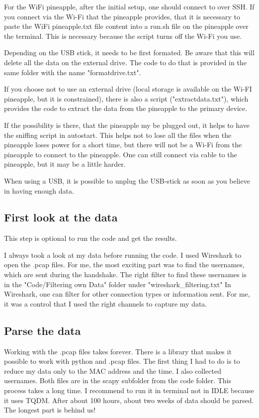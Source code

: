 \documentclass[11pt]{article}
\begin{document}
For the WiFi pineapple, after the initial setup, one should connect to over SSH. 
If you connect via the Wi-Fi that the pineapple provides, that it is necessary to paste the WiFi pineapple.txt file content into a run.sh file on the pineapple over the terminal. 
This is necessary because the script turns off the Wi-Fi you use.

Depending on the USB stick, it needs to be first formated. Be aware that this will delete all the data on the external drive.
The code to do that is provided in the same folder with the name "formatdrive.txt".

If you choose not to use an external drive (local storage is available on the Wi-FI pineapple, but it is constrained), there is also a script ("extractdata.txt"), which provides the code to extract the data from the pineapple to the primary device.

If the possibility is there, that the pineapple my be plugged out, it helps to have the sniffing script in autostart. This helps not to lose all the files when the pineapple loses power for a short time, but there will not be a Wi-Fi from the pineapple to connect to the pineapple. One can still connect via cable to the pineapple, but it may be a little harder.

When using a USB, it is possible to unplug the USB-stick as soon as you believe in having enough data.

\subsection{First look at the data}
This step is optional to run the code and get the results.

I always took a look at my data before running the code. I used Wireshark to open the .pcap files. 
For me, the most exciting part was to find the usernames, which are sent during the handshake.
The right filter to find these usernames is in the "Code/Filtering own Data" folder under "wireshark\_filtering.txt"
In Wireshark, one can filter for other connection types or information sent. For me, it was a control that I used the right channels to capture my data.

\subsection{Parse the data}
Working with the .pcap files takes forever. There is a library that makes it possible to work with python and .pcap files.
The first thing I had to do is to reduce my data only to the MAC address and the time. I also collected usernames. Both files are in the scapy subfolder from the code folder. 
This process takes a long time. I recommend to run it in terminal not in IDLE because it uses TQDM.
After about 100 hours, about two weeks of data should be parsed. The longest part is behind us!
\end{document}

